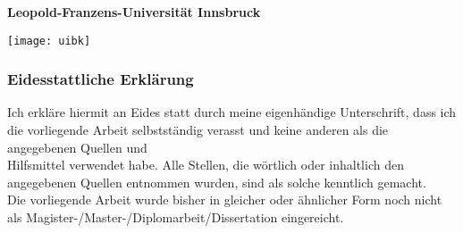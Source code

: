 \begin{titlepage}
    \textbf{Leopold-Franzens-Universit\"at Innsbruck}
    \hfill\begin{minipage}{.15\textwidth}
        \centering
        \texttt{[image: uibk]}
    \end{minipage}

    \subsubsection*{Eidesstattliche Erklärung}
    Ich erkläre hiermit an Eides statt durch meine eigenhändige Unterschrift, dass ich die vorliegende Arbeit selbstständig verasst und keine anderen als die angegebenen Quellen und\\Hilfsmittel verwendet habe.
    Alle Stellen, die wörtlich oder inhaltlich den angegebenen Quellen entnommen wurden, sind als solche kenntlich gemacht.\\
    [0.5cm]
    Die vorliegende Arbeit wurde bisher in gleicher oder ähnlicher Form noch nicht als Magister-/Master-/Diplomarbeit/Dissertation eingereicht.\\
    [1cm]


    \begin{figure}[h!]
        \hfill
    \end{figure}
\end{titlepage}
